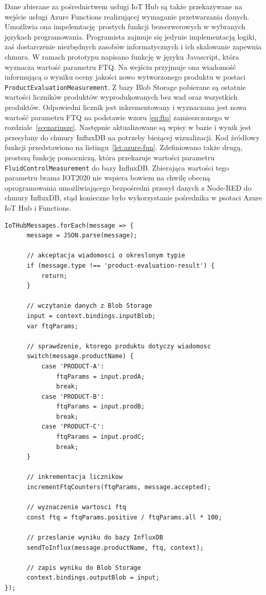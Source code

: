 \documentclass[a4paper, 12pt, twoside]{article}
\begin{document}
Dane zbierane za pośrednictwem usługi IoT Hub są także przekazywane na
wejście usługi Azure Functions realizującej wymaganie przetwarzania danych.
Umożliwia ona impelemtację prostych funkcji bezserwerowych w wybranych językach programowania.
Programista zajmuje się jedynie implementacją logiki, zaś dostarczenie niezbędnych
zasobów informatycznych i ich skalowanie zapewnia chmura.
W ramach prototypu napisano funkcję w języku Javascript, która wyznacza
wartość parametru FTQ. Na wejściu przyjmuje ona wiadomość informującą o wyniku
oceny jakości nowo wytworzonego produktu w postaci \texttt{ProductEvaluationMeasurement}.
Z bazy Blob Storage pobierane są ostatnie wartości liczników produktów wyprodukowanych
bez wad oraz wszystkich produktów. Odpowiedni licznik jest inkrementowany
i wyznaczana jest nowa wartość parametru FTQ na podstawie wzoru \ref{eq:ftq}
zamieszczonego w rozdziale~\ref{scenariusze}. Następnie aktualizowane są wpisy
w bazie i wynik jest przesyłany do chmury InfluxDB na potrzeby bieżącej wizualizacji.
Kod źródłowy funkcji przedstawiono na listingu~\ref{lst:azure-fun}. Zdefiniowano
także drugą, prostszą funkcję pomocniczą, która przekazuje wartości parametru \texttt{FluidControlMeasurement}
do bazy InfluxDB. Zbierająca wartości tego parametru brama IOT2020
nie wspiera bowiem na chwilę obecną oprogramowania
umożliwiającego bezpośredni przesył danych z Node-RED do chmury InfluxDB, stąd
konieczne było wykorzystanie pośrednika w psotaci Azure IoT Hub i Functions.

\begin{lstlisting}[caption={Kod źródłowy funkcji wyznaczającej aktualną wartość 
      parametru FTQ osadzonej w usłudze Azure Functions}, label={lst:azure-fun}]
IoTHubMessages.forEach(message => {
      message = JSON.parse(message);
 
      // akceptacja wiadomosci o okreslonym typie
      if (message.type !== 'product-evaluation-result') {
          return;
      }
  
      // wczytanie danych z Blob Storage
      input = context.bindings.inputBlob;
      var ftqParams;

      // sprawdzenie, ktorego produktu dotyczy wiadomosc
      switch(message.productName) {
          case 'PRODUCT-A':
              ftqParams = input.prodA;
              break;
          case 'PRODUCT-B':
              ftqParams = input.prodB;
              break;
          case 'PRODUCT-C':
              ftqParams = input.prodC;
              break;
      }

      // inkrementacja licznikow
      incrementFtqCounters(ftqParams, message.accepted);

      // wyznaczenie wartosci ftq
      const ftq = ftqParams.positive / ftqParams.all * 100;

      // przeslanie wyniku do bazy InfluxDB
      sendToInflux(message.productName, ftq, context);

      // zapis wyniku do Blob Storage
      context.bindings.outputBlob = input;
});   
\end{lstlisting}
\end{document}

